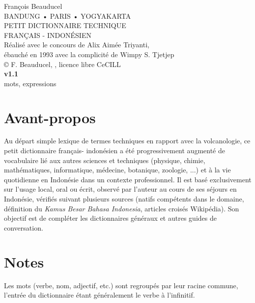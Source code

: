 \documentclass[10pt,twocolumns]{article}
\title{}
\author{}
\begin{document}

\begin{centering}
{\Large François Beauducel}\\[.2cm]
{\small BANDUNG • PARIS • YOGYAKARTA}\\[5cm]
{\Large PETIT DICTIONNAIRE TECHNIQUE}\\[.5cm]
{\fontsize{36}{40}\selectfont FRANÇAIS - INDONÉSIEN}\\[8cm]
Réalisé avec le concours de Alix Aimée Triyanti,\\
ébauché en 1993 avec la complicité de Wimpy S. Tjetjep\\[.2cm]
© F. Beauducel, \the\year{}, licence libre CeCILL\\[1cm]
{\Large\textbf{v1.1}}\\[.2cm]
 mots,  expressions\\
\end{centering}


\twocolumn
\flushleft

\small

\section*{Avant-propos}
Au départ simple lexique de termes techniques en rapport avec la volcanologie, ce petit dictionnaire français- indonésien a été progressivement augmenté de vocabulaire lié aux autres sciences et techniques (physique, chimie, mathématiques, informatique, médecine, botanique, zoologie, ...) et à la vie quotidienne en Indonésie dans un contexte professionnel. Il est basé exclusivement sur l'usage local, oral ou écrit, observé par l'auteur au cours de ses séjours en Indonésie, vérifiés suivant plusieurs sources (natifs compétents dans le domaine, définition du \textit{Kamus Besar Bahasa Indonesia}, articles croisés Wikipédia). Son objectif est de compléter les dictionnaires généraux et autres guides de conversation.

\section*{Notes}
Les mots (verbe, nom, adjectif, etc.) sont regroupés par leur racine commune, l'entrée du dictionnaire étant généralement le verbe à l'infinitif.
\end{document}
